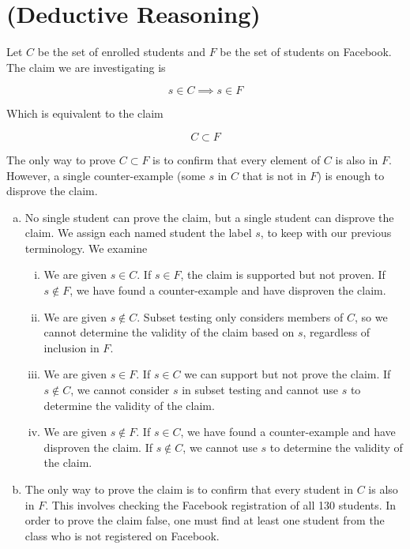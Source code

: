 \documentclass[12pt]{article}
\begin{document}
\section{(Deductive Reasoning)}
Let $C$ be the set of enrolled students and $F$ be the set of students on Facebook. The claim we are investigating is 

$$s \in C \implies s \in F$$

\noindent Which is equivalent to the claim

$$C \subset F$$

The only way to prove $C \subset F$ is to confirm that every element of $C$ is also in $F$. However, a single counter-example (some $s$ in $C$ that is not in $F$) is enough to disprove the claim.
\begin{enumerate}[(a)]
\item No single student can prove the claim, but a single student can disprove the claim. We assign each named student the label $s$, to keep with our previous terminology. We examine 
\begin{enumerate}[i.]
\item
We are given $s \in C$. If $s \in F$, the claim is supported but not proven. If $s \notin F$, we have found a counter-example and have disproven the claim.

\item
We are given $s \notin C$. Subset testing only considers members of $C$, so we cannot determine the validity of the claim based on $s$, regardless of inclusion in $F$.

\item
We are given $s \in F$. If $s \in C$ we can support but not prove the claim. If $s \notin C$, we cannot consider $s$ in subset testing and cannot use $s$ to determine the validity of the claim.

\item
We are given $s \notin F$. If $s \in C$, we have found a counter-example and have disproven the claim. If $s \notin C$, we cannot use $s$ to determine the validity of the claim.
\end{enumerate}

\item The only way to prove the claim is to confirm that every student in $C$ is also in $F$. This involves checking the Facebook registration of all 130 students. In order to prove the claim false, one must find at least one student from the class who is not registered on Facebook.
\end{enumerate}
\end{document}
